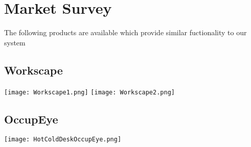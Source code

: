 \chapter{Market Survey}
The following products are available which provide similar fuctionality to our system

\section{Workscape}

\texttt{[image: Workscape1.png]}
\texttt{[image: Workscape2.png]}

\section{OccupEye}

\texttt{[image: HotColdDeskOccupEye.png]}


  
